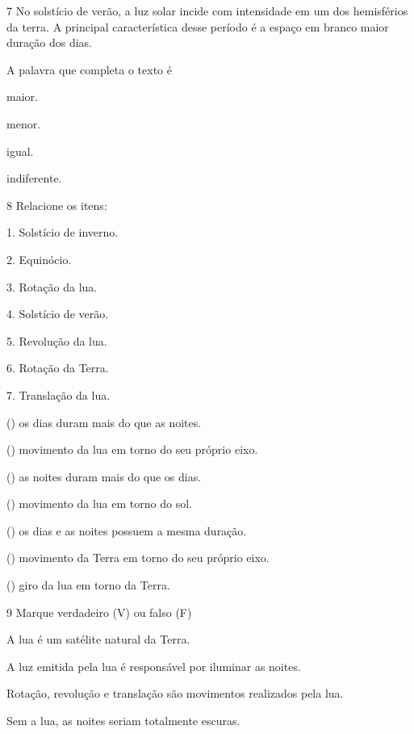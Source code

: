 \num{7} No solstício de verão, a luz solar incide com \preencher\preencher{}
intensidade em um dos hemisférios da terra. A principal característica
desse período é a espaço em branco maior duração dos dias.

A palavra que completa o texto é

\begin{escolha}
\item maior.

\item menor.

\item igual.

\item indiferente.
\end{escolha}


\num{8} Relacione os itens:

\begin{multicols}{1}
1. Solstício de inverno.

2. Equinócio.

3. Rotação da lua.

4. Solstício de verão.

5. Revolução da lua.

6. Rotação da Terra.

7. Translação da lua.

\columnbreak

() os dias duram mais do que as noites.

() movimento da lua em torno do seu próprio eixo.

() as noites duram mais do que os dias.

() movimento da lua em torno do sol.

() os dias e as noites possuem a mesma duração.

() movimento da Terra em torno do seu próprio eixo.

() giro da lua em torno da Terra.
\end{multicols}

\num{9} Marque verdadeiro (V) ou falso (F)

\begin{boxlist}
\item A lua é um satélite natural da Terra. 

\item A luz emitida pela lua é responsável por iluminar as noites. 

\item Rotação, revolução e translação são movimentos realizados pela lua. 

\item Sem a lua, as noites seriam totalmente escuras. 
\end{boxlist}

